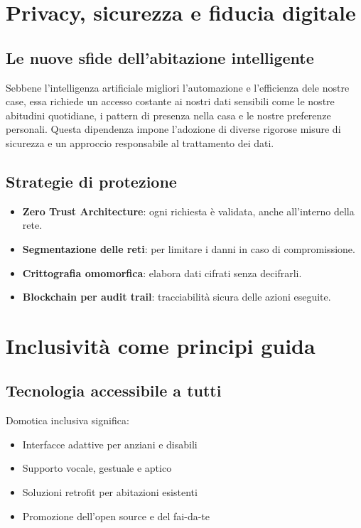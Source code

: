 \section{Privacy, sicurezza e fiducia digitale}

\subsection{Le nuove sfide dell’abitazione intelligente}

Sebbene l’intelligenza artificiale migliori l’automazione e l’efficienza dele nostre case, essa richiede un accesso costante ai nostri dati sensibili come le nostre abitudini quotidiane, i pattern di presenza nella casa e le nostre preferenze personali. Questa dipendenza  impone l’adozione di diverse rigorose misure di sicurezza e un approccio responsabile al trattamento dei dati.

\subsection{Strategie di protezione}

\begin{itemize}
    \item \textbf{Zero Trust Architecture}: ogni richiesta è validata, anche all’interno della rete.
    \item \textbf{Segmentazione delle reti}: per limitare i danni in caso di compromissione.
    \item \textbf{Crittografia omomorfica}: elabora dati cifrati senza decifrarli.
    \item \textbf{Blockchain per audit trail}: tracciabilità sicura delle azioni eseguite.
\end{itemize}
\section{Inclusività come principi guida}

\subsection{Tecnologia accessibile a tutti}

Domotica inclusiva significa:
\begin{itemize}
    \item Interfacce adattive per anziani e disabili
    \item Supporto vocale, gestuale e aptico
    \item Soluzioni retrofit per abitazioni esistenti
    \item Promozione dell’open source e del fai-da-te
\end{itemize}

